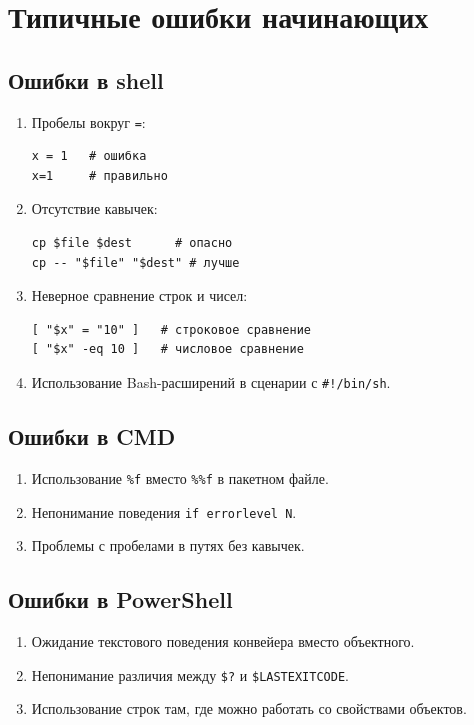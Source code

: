 \documentclass[12pt,a4paper]{article}
\begin{document}
\section{Типичные ошибки начинающих}

\subsection{Ошибки в shell}

\begin{enumerate}
    \item Пробелы вокруг \texttt{=}:
\begin{lstlisting}
x = 1   # ошибка
x=1     # правильно
\end{lstlisting}

    \item Отсутствие кавычек:
\begin{lstlisting}
cp $file $dest      # опасно
cp -- "$file" "$dest" # лучше
\end{lstlisting}

    \item Неверное сравнение строк и чисел:
\begin{lstlisting}
[ "$x" = "10" ]   # строковое сравнение
[ "$x" -eq 10 ]   # числовое сравнение
\end{lstlisting}

    \item Использование Bash-расширений в сценарии с \texttt{\#!/bin/sh}.
\end{enumerate}

\subsection{Ошибки в CMD}

\begin{enumerate}
    \item Использование \texttt{\%f} вместо \texttt{\%\%f} в пакетном файле.
    \item Непонимание поведения \texttt{if errorlevel N}.
    \item Проблемы с пробелами в путях без кавычек.
\end{enumerate}

\subsection{Ошибки в PowerShell}

\begin{enumerate}
    \item Ожидание текстового поведения конвейера вместо объектного.
    \item Непонимание различия между \texttt{\$?} и \texttt{\$LASTEXITCODE}.
    \item Использование строк там, где можно работать со свойствами объектов.
\end{enumerate}
\end{document}
